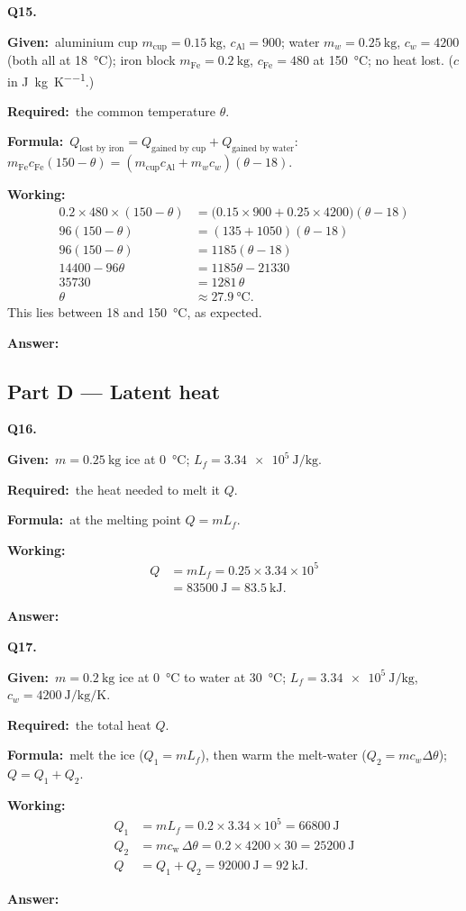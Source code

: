 \documentclass[10pt]{article}
\newcommand{\Given}{\par\vspace{2pt}\textbf{Given:}\ }
\newcommand{\Required}{\par\vspace{2pt}\textbf{Required:}\ }
\newcommand{\Formula}{\par\vspace{2pt}\textbf{Formula:}\ }
\newcommand{\Working}{\par\vspace{2pt}\textbf{Working:}}
\newcommand{\Answer}[1]{\par\vspace{2pt}\textbf{Answer:}\ \fbox{#1}}
\begin{document}
\textbf{Q15.}
\Given aluminium cup $m_{\text{cup}}=\SI{0.15}{\kilogram}$,
$c_{\text{Al}}=900$; water $m_w=\SI{0.25}{\kilogram}$, $c_w=4200$
(both all at \SI{18}{\degreeCelsius}); iron block
$m_{\text{Fe}}=\SI{0.2}{\kilogram}$, $c_{\text{Fe}}=480$ at
\SI{150}{\degreeCelsius}; no heat lost. ($c$ in
\si{\joule\per\kilogram\per\kelvin}.)
\Required the common temperature $\theta$.
\Formula $Q_{\text{lost by iron}}=Q_{\text{gained by cup}}+Q_{\text{gained by water}}$:
$m_{\text{Fe}}c_{\text{Fe}}(150-\theta)
=(m_{\text{cup}}c_{\text{Al}}+m_w c_w)(\theta-18)$.
\Working
\begin{align*}
  0.2 \times 480 \times (150-\theta)
    &= \big(0.15\times900 + 0.25\times4200\big)(\theta-18)\\
  96(150-\theta) &= (135 + 1050)(\theta-18)\\
  96(150-\theta) &= 1185(\theta-18)\\
  14400 - 96\theta &= 1185\theta - 21330\\
  35730 &= 1281\,\theta\\
  \theta &\approx \SI{27.9}{\degreeCelsius}.
\end{align*}
This lies between \SI{18}{} and \SI{150}{\degreeCelsius}, as expected.
\Answer{$\theta \approx \SI{27.9}{\degreeCelsius}$}

\subsection*{Part D --- Latent heat}

\textbf{Q16.}
\Given $m=\SI{0.25}{\kilogram}$ ice at \SI{0}{\degreeCelsius};
$L_f=\SI{3.34e5}{\joule\per\kilogram}$.
\Required the heat needed to melt it $Q$.
\Formula at the melting point $Q=mL_f$.
\Working
\begin{align*}
  Q &= mL_f = 0.25 \times 3.34\times10^{5}\\
    &= \SI{83500}{\joule} = \SI{83.5}{\kilo\joule}.
\end{align*}
\Answer{$Q = \SI{83.5}{\kilo\joule}$}

\textbf{Q17.}
\Given $m=\SI{0.2}{\kilogram}$ ice at \SI{0}{\degreeCelsius} to water at
\SI{30}{\degreeCelsius}; $L_f=\SI{3.34e5}{\joule\per\kilogram}$,
$c_w=\SI{4200}{\joule\per\kilogram\per\kelvin}$.
\Required the total heat $Q$.
\Formula melt the ice ($Q_1=mL_f$), then warm the melt-water
($Q_2=mc_w\Delta\theta$); $Q=Q_1+Q_2$.
\Working
\begin{align*}
  Q_1 &= mL_f = 0.2 \times 3.34\times10^{5} = \SI{66800}{\joule}\\
  Q_2 &= mc_{\text{w}}\,\Delta\theta = 0.2 \times 4200 \times 30 = \SI{25200}{\joule}\\
  Q &= Q_1 + Q_2 = \SI{92000}{\joule} = \SI{92}{\kilo\joule}.
\end{align*}
\Answer{$Q = \SI{92}{\kilo\joule}$}
\end{document}
